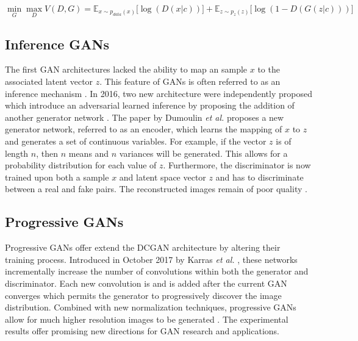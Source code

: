 \documentclass[11pt]{article}
\begin{document}
$$\min_{G}\max_{D}V(D, G) = \mathbb{E}_{x\sim p_{data}(x)}\Big[\log(D(x|c))\Big] + \mathbb{E}_{z\sim p_z(z)}\Big[\log(1-D(G(z|c)))\Big]$$

\subsection{Inference GANs} \label{sec:inferencegan}
The first GAN architectures lacked the ability to map an sample $x$ to the associated latent vector $z$. This feature of GANs is often referred to as an inference mechanism \citep{2017arXiv171007035C}. In 2016, two new architecture were independently proposed which introduce an adversarial learned inference by proposing the addition of another generator network \citep{2016arXiv160509782D, 2016arXiv160600704D}. The paper by Dumoulin \textit{et al.} proposes a new generator network, referred to as an encoder, which learns the mapping of $x$ to $z$ and generates a set of continuous variables. For example, if the vector $z$ is of length $n$, then $n$ means and $n$ variances will be generated. This allows for a probability distribution for each value of $z$. Furthermore, the discriminator is now trained upon both a sample $x$ and latent space vector $z$ and has to discriminate between a real and fake pairs. The reconstructed images remain of poor quality \citep{2017arXiv171007035C}.

\subsection{Progressive GANs}
Progressive GANs offer extend the DCGAN architecture by altering their training process. Introduced in October 2017 by Karras \textit{et al.} \citep{2017arXiv171010196K}, these networks incrementally increase the number of convolutions within both the generator and discriminator. Each new convolution is  and is added after the current GAN converges which permits the generator to progressively discover the image distribution. Combined with new normalization techniques, progressive GANs allow for much higher resolution images to be generated \citep{2017arXiv171010196K}. The experimental results offer promising new directions for GAN research and applications.
\end{document}
